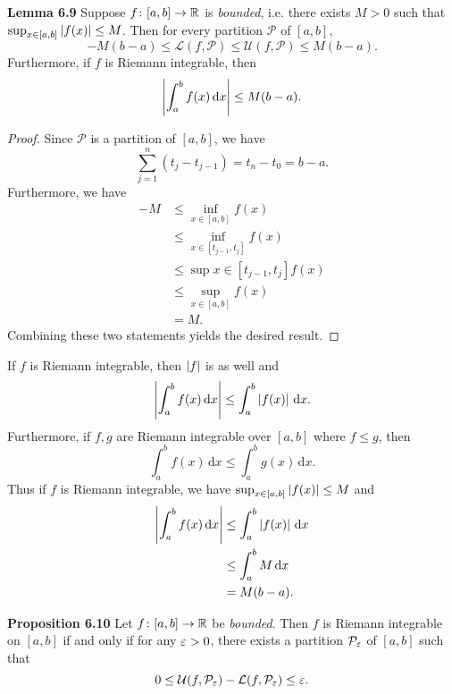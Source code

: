 \documentclass[class=article, crop=false]{standalone}
\begin{document}
  \textbf{Lemma 6.9} Suppose $f\colon [a, b]\to \mathbb{R}$ is \emph{bounded}, i.e. there exists $M > 0$ such that $\sup_{x\in [a, b]}\left\lvert f(x) \right\rvert\leq M$. Then for every partition $\mathcal{P}$ of $[a, b]$, 
  \[
    -M(b - a)\leq \mathcal{L}(f, \mathcal{P})\leq \mathcal{U}(f, \mathcal{P})\leq M(b - a).
  \]
  Furthermore, if $f$ is Riemann integrable, then
  \[
    \left\lvert \int_{a}^{b}f(x) \,\mathrm dx \right\rvert\leq M(b - a).
  \]
  \begin{proof}
    Since $\mathcal{P}$ is a partition of $[a, b]$, we have
    \[
      \sum_{j=1}^{n}(t_j - t_{j - 1}) = t_n - t_0 = b - a.
    \]
    Furthermore, we have
    \begin{align*}
      -M &\leq \inf_{x\in [a, b]} f(x) \\
         &\leq \inf_{x\in [t_{j - 1}, t_j]}f(x) \\
         &\leq \sup{x\in [t_{j - 1}, t_j]}f(x) \\
         &\leq \sup_{x\in [a, b]} f(x) \\
         &= M.
    \end{align*}
    Combining these two statements yields the desired result.
  \end{proof}
  \begin{note}{}
    If $f$ is Riemann integrable, then $\left\lvert f \right\rvert$ is as well and
    \[
      \left\lvert \int_{a}^{b}f(x) \,\mathrm dx \right\rvert \leq \int_{a}^{b}\left\lvert f(x) \right\rvert \,\mathrm dx.
    \]
    Furthermore, if $f, g$ are Riemann integrable over $[a, b]$ where $f\leq g$, then
    \[
      \int_{a}^{b}f(x) \,\mathrm dx\leq \int_{a}^{b}g(x) \,\mathrm dx.
    \]
    Thus if $f$ is Riemann integrable, we have $\sup_{x\in [a, b]}\left\lvert f(x) \right\rvert\leq M$ and
    \begin{align*}
      \left\lvert \int_{a}^{b}f(x) \,\mathrm dx \right\rvert &\leq \int_{a}^{b}\left\lvert f(x) \right\rvert \,\mathrm dx \\
                                          &\leq \int_{a}^{b}M \,\mathrm dx \\
                                          &= M(b - a).
    \end{align*}
  \end{note}
  \textbf{Proposition 6.10} Let $f\colon [a, b]\to \mathbb{R}$ be \emph{bounded}. Then $f$ is Riemann integrable on $[a, b]$ if and only if for any $\varepsilon > 0$, there exists a partition $\mathcal{P}_{\varepsilon}$ of $[a, b]$ such that
  \[
    0\leq \mathcal{U}(f, \mathcal{P}_{\varepsilon}) - \mathcal{L}(f, \mathcal{P}_{\varepsilon})\leq \varepsilon.
  \]
\end{document}
